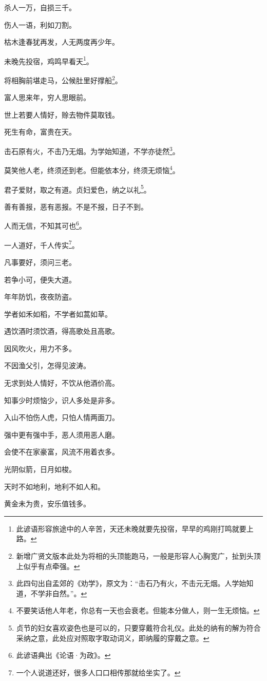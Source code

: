 \documentclass[12pt,oneside]{book}
\begin{document}
杀人一万，自损三千。

伤人一语，利如刀割。

枯木逢春犹再发，人无两度再少年。

未晚先投宿，鸡鸣早看天\footnote{此谚语形容旅途中的人辛苦，天还未晚就要先投宿，早早的鸡刚打鸣就要上路。}。

将相胸前堪走马，公候肚里好撑船\footnote{新增广贤文版本此处为将相的头顶能跑马，一般是形容人心胸宽广，扯到头顶上似乎有点牵强。}。

富人思来年，穷人思眼前。

世上若要人情好，赊去物件莫取钱。

死生有命，富贵在天。

击石原有火，不击乃无烟。为学始知道，不学亦徒然\footnote{此四句出自孟郊的《劝学》，原文为：“击石乃有火，不击元无烟。人学始知道，不学非自然。”。}。

莫笑他人老，终须还到老。但能依本分，终须无烦恼\footnote{不要笑话他人年老，你总有一天也会衰老。但能本分做人，则一生无烦恼。}。

君子爱财，取之有道。贞妇爱色，纳之以礼\footnote{贞节的妇女喜欢姿色也是可以的，只要穿戴符合礼仪。此处的纳有的解为符合采纳之意，此处应对照取字取动词义，即纳履的穿戴之意。}。

善有善报，恶有恶报。不是不报，日子不到。

人而无信，不知其可也\footnote{此谚语典出《论语·为政》。}。

一人道好，千人传实\footnote{一个人说道还好，很多人口口相传那就给坐实了。}。

凡事要好，须问三老。

若争小可，便失大道。

年年防饥，夜夜防盗。

学者如禾如稻，不学者如蒿如草。

遇饮酒时须饮酒，得高歌处且高歌。

因风吹火，用力不多。

不因渔父引，怎得见波涛。

无求到处人情好，不饮从他酒价高。

知事少时烦恼少，识人多处是非多。

入山不怕伤人虎，只怕人情两面刀。

强中更有强中手，恶人须用恶人磨。

会使不在家豪富，风流不用着衣多。

光阴似箭，日月如梭。

天时不如地利，地利不如人和。

黄金未为贵，安乐值钱多。
\end{document}
